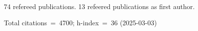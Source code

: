 74 refereed publications. 13 refeered publications as first author.

Total citations~=~4700; h-index~=~36 (2025-03-03)